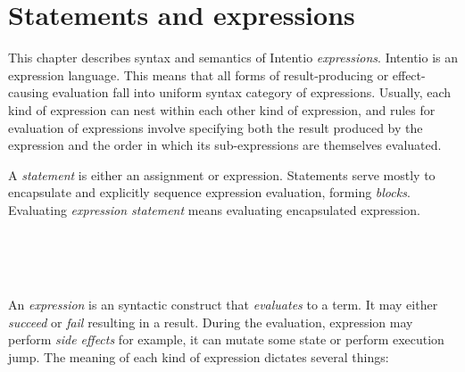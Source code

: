 \chapter{Statements and expressions}

This chapter describes syntax and semantics of Intentio \emph{expressions}. Intentio is an expression language. This means that all forms of result-producing or effect-causing evaluation fall into uniform syntax category of expressions. Usually, each kind of expression can nest within each other kind of expression, and rules for evaluation of expressions involve specifying both the result produced by the expression and the order in which its sub-expressions are themselves evaluated.

A \emph{statement} is either an assignment or expression. Statements serve mostly to encapsulate and explicitly sequence expression evaluation, forming \emph{blocks}. Evaluating \emph{expression statement} means evaluating encapsulated expression.

\begin{bnf}
   \eq    {}  
            \gorln {}     \\
  \\
   \eq    {}                      
            \gorln {}                 
            \gorln {}                   
            \gorln {}                    
            \gorln {}                   
            \gorln \term{(} \  \ \term{)}  
            \gorln {}                    
            \gorln {}                   
            \gorln {}                      
            \gorln {}                  
\end{bnf}

An \emph{expression} is an syntactic construct that \emph{evaluates} to a term. It may either \emph{succeed} or \emph{fail} resulting in a result. During the evaluation, expression may perform \emph{side effects} for example, it can mutate some state or perform execution jump. The meaning of each kind of expression dictates several things:

